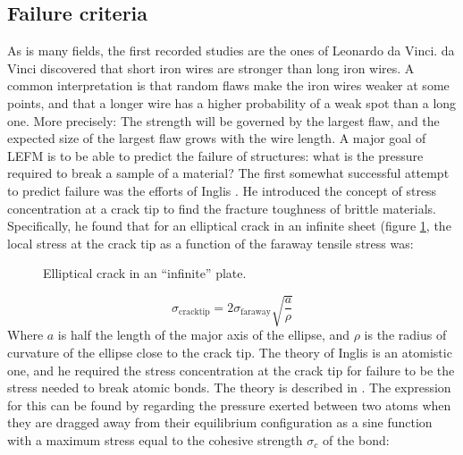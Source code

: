 \subsection{Failure criteria}
As is many fields, the first recorded studies are the ones of Leonardo da Vinci. da Vinci discovered that short iron wires are stronger than long iron wires. A common interpretation is that random flaws make the iron wires weaker at some points, and that a longer wire has a higher probability of a weak spot than a long one. More precisely: The strength will be governed by the largest flaw, and the expected size of the largest flaw grows with the wire length. A major goal of LEFM is to be able to predict the failure of structures: what is the pressure required to break a sample of a material? The first somewhat successful attempt to predict failure was the efforts of Inglis \cite{inglis1913stresses}. He introduced the concept of stress concentration at a crack tip to find the fracture toughness of brittle materials. Specifically, he found that for an elliptical crack in an infinite sheet (figure \ref{fig:elliptical_crack}, the local stress at the crack tip as a function of the faraway tensile stress was:
\begin{figure}
\centering
{}
\caption{Elliptical crack in an ``infinite'' plate.}
\label{fig:elliptical_crack}
\end{figure}
\begin{equation}
	\sigma_{\text{cracktip}} = 2\sigma_{\text{faraway}}\sqrt{\frac{a}{\rho}}
	\label{eq:stress_consentration}
\end{equation}
Where $a$ is half the length of the major axis of the ellipse, and $\rho$ is the radius of curvature of the ellipse close to the crack tip. The theory of Inglis is an atomistic one, and he required the stress concentration at the crack tip for failure to be the stress needed to break atomic bonds. The theory is described in \citet[p.27]{Anderson2005}. The expression for this can be found by regarding the pressure exerted between two atoms when they are dragged away from their equilibrium configuration as a sine function with a maximum stress equal to the cohesive strength $\sigma_c$ of the bond:

